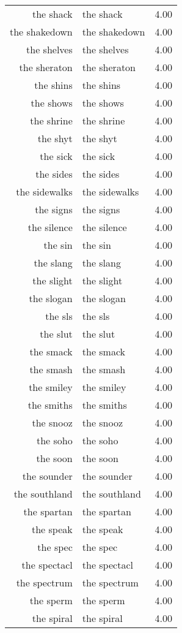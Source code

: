 \begin{table}[ht]
\begin{tabular}{rlr}
  the shack & the shack & 4.00 \\ 
  the shakedown & the shakedown & 4.00 \\ 
  the shelves & the shelves & 4.00 \\ 
  the sheraton & the sheraton & 4.00 \\ 
  the shins & the shins & 4.00 \\ 
  the shows & the shows & 4.00 \\ 
  the shrine & the shrine & 4.00 \\ 
  the shyt & the shyt & 4.00 \\ 
  the sick & the sick & 4.00 \\ 
  the sides & the sides & 4.00 \\ 
  the sidewalks & the sidewalks & 4.00 \\ 
  the signs & the signs & 4.00 \\ 
  the silence & the silence & 4.00 \\ 
  the sin & the sin & 4.00 \\ 
  the slang & the slang & 4.00 \\ 
  the slight & the slight & 4.00 \\ 
  the slogan & the slogan & 4.00 \\ 
  the sls & the sls & 4.00 \\ 
  the slut & the slut & 4.00 \\ 
  the smack & the smack & 4.00 \\ 
  the smash & the smash & 4.00 \\ 
  the smiley & the smiley & 4.00 \\ 
  the smiths & the smiths & 4.00 \\ 
  the snooz & the snooz & 4.00 \\ 
  the soho & the soho & 4.00 \\ 
  the soon & the soon & 4.00 \\ 
  the sounder & the sounder & 4.00 \\ 
  the southland & the southland & 4.00 \\ 
  the spartan & the spartan & 4.00 \\ 
  the speak & the speak & 4.00 \\ 
  the spec & the spec & 4.00 \\ 
  the spectacl & the spectacl & 4.00 \\ 
  the spectrum & the spectrum & 4.00 \\ 
  the sperm & the sperm & 4.00 \\ 
  the spiral & the spiral & 4.00 \\ 

\end{tabular}
\end{table}
